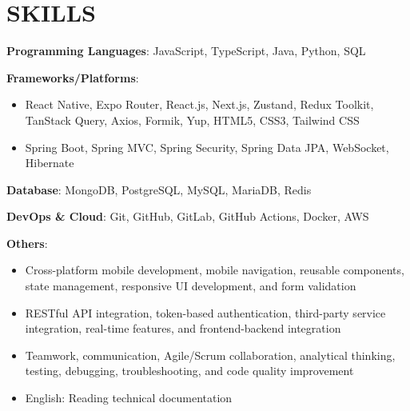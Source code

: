 \section{SKILLS}
\resumeSubHeadingListStart

  \item
    \resumeItemListStart
      \item \textbf{Programming Languages}: JavaScript, TypeScript, Java, Python, SQL
      \item \textbf{Frameworks/Platforms}:
        \begin{itemize}
          \item React Native, Expo Router, React.js, Next.js, Zustand, Redux Toolkit, TanStack Query, Axios, Formik, Yup, HTML5, CSS3, Tailwind CSS
          \item Spring Boot, Spring MVC, Spring Security, Spring Data JPA, WebSocket, Hibernate
        \end{itemize}
      \item \textbf{Database}: MongoDB, PostgreSQL, MySQL, MariaDB, Redis
      \item \textbf{DevOps \& Cloud}: Git, GitHub, GitLab, GitHub Actions, Docker, AWS
      \item \textbf{Others}:
        \begin{itemize}
          \item Cross-platform mobile development, mobile navigation, reusable components, state management, responsive UI development, and form validation
          \item RESTful API integration, token-based authentication, third-party service integration, real-time features, and frontend-backend integration
          \item Teamwork, communication, Agile/Scrum collaboration, analytical thinking, testing, debugging, troubleshooting, and code quality improvement
          \item English: Reading technical documentation
        \end{itemize}
    \resumeItemListEnd

\resumeSubHeadingListEnd
